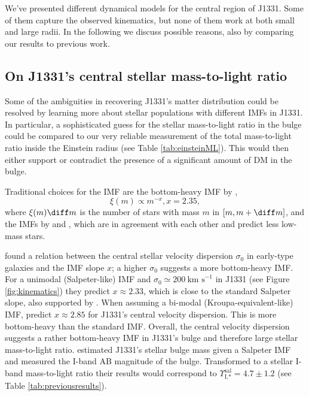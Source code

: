 We've presented different dynamical models for the central region of J1331. Some of them capture the observed kinematics, but none of them work at both small and large radii. In the following we discuss possible reasons, also by comparing our results to previous work.

\subsection{On J1331's central stellar mass-to-light ratio} \label{sec:MLdiscussion}

Some of the ambiguities in recovering J1331's matter distribution could be resolved by learning more about stellar populations with different IMFs in J1331. In particular, a sophisticated guess for the stellar mass-to-light ratio in the bulge could be compared to our very reliable measurement of the total mass-to-light ratio inside the Einstein radius (see Table \ref{tab:einsteinML}). This would then either support or contradict the presence of a significant amount of DM in the bulge.

Traditional choices for the IMF are the bottom-heavy IMF by \citet{Salpeter1955},
$$\xi(m) \propto m^{-x}, x=2.35,$$
where $\xi(m) \diff m$ is the number of stars with mass $m$ in $[m,m+\diff m]$, and the IMFs by \citet{2002Sci...295...82K} and \citet{Chabrier2003}, which are in agreement with each other and predict less low-mass stars.

\citet{Ferreras} found a relation between the central stellar velocity dispersion $\sigma_0$ in early-type galaxies and the IMF slope $x$; a higher $\sigma_0$ suggests a more bottom-heavy IMF. For a unimodal (Salpeter-like) IMF and $\sigma_0 \simeq 200~\text{km s}^{-1}$ in J1331 (see Figure \ref{fig:kinematics}) they predict $x \approx 2.33$, which is close to the standard Salpeter slope, also supported by \citet{2014MNRAS.438.1483S}. When assuming a bi-modal (Kroupa-equivalent-like) IMF, \citet{Ferreras} predict $x \approx 2.85$ for J1331's central velocity dispersion. This is more bottom-heavy than the standard \citet{2002Sci...295...82K} IMF. Overall, the central velocity dispersion suggests a rather bottom-heavy IMF in J1331's bulge and therefore large stellar mass-to-light ratio. \citet{SWELLSI} estimated J1331's stellar bulge mass given a Salpeter IMF and measured the I-band AB magnitude of the bulge. Transformed to a stellar I-band mass-to-light ratio their results would correspond to $\Upsilon_\text{I,*}^\text{sal} = 4.7 \pm 1.2$ (see Table \ref{tab:previousresults}).

